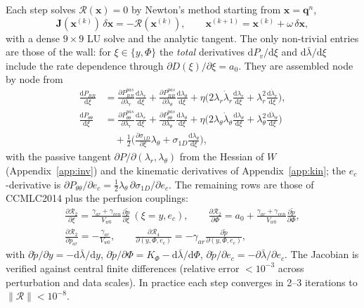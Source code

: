 \documentclass[11pt,a4paper]{article}
\newcommand{\dd}{\mathrm d}
\newcommand{\lt}{\lambda_\theta}
\newcommand{\lr}{\lambda_r}
\newcommand{\lb}{\bar\lambda}
\newcommand{\pf}{\tilde p}
\newcommand{\Vw}{V_{w0}}
\newcommand{\sig}{\sigma_{1D}}
\begin{document}
Each step solves $\mathcal R(\mathbf x)=0$ by Newton's method starting from $\mathbf x=\mathbf q^n$,
\[
\mathbf J(\mathbf x^{(k)})\,\delta\mathbf x=-\mathcal R(\mathbf x^{(k)}),\qquad \mathbf x^{(k+1)}=\mathbf x^{(k)}+\omega\,\delta\mathbf x,
\]
with a dense $9\times9$ LU solve and the analytic tangent. The only non-trivial entries are those of the wall: for $\xi\in\{y,\Phi\}$ the \emph{total} derivatives $\dd P_v/\dd\xi$ and $\dd\lb/\dd\xi$ include the rate dependence through $\partial D(\xi)/\partial\xi=a_0$. They are assembled node by node from
\begin{align*}
\frac{\dd P_{RR}}{\dd\xi}&=\frac{\partial P_{RR}^{pas}}{\partial\lr}\frac{\dd\lr}{\dd\xi}+\frac{\partial P_{RR}^{pas}}{\partial\lt}\frac{\dd\lt}{\dd\xi}+\eta\Big(2\lr\dot\lr\frac{\dd\lr}{\dd\xi}+\lr^2\frac{\dd\dot\lr}{\dd\xi}\Big),\\
\frac{\dd P_{\theta\theta}}{\dd\xi}&=\frac{\partial P_{\theta\theta}^{pas}}{\partial\lr}\frac{\dd\lr}{\dd\xi}+\frac{\partial P_{\theta\theta}^{pas}}{\partial\lt}\frac{\dd\lt}{\dd\xi}+\eta\Big(2\lt\dot\lt\frac{\dd\lt}{\dd\xi}+\lt^2\frac{\dd\dot\lt}{\dd\xi}\Big)\\
&\quad+\tfrac12\Big(\frac{\partial\sig}{\partial\xi}\lt+\sig\frac{\dd\lt}{\dd\xi}\Big),
\end{align*}
with the passive tangent $\partial P/\partial(\lr,\lt)$ from the Hessian of $W$ (Appendix~\ref{app:inv}) and the kinematic derivatives of Appendix~\ref{app:kin}; the $e_c$-derivative is $\partial P_{\theta\theta}/\partial e_c=\tfrac12\lt\,\partial\sig/\partial e_c$. The remaining rows are those of CCMLC2014 plus the perfusion couplings:
\begin{gather*}
\frac{\partial\mathcal R_2}{\partial\xi}=\frac{\gamma_{ar}+\gamma_{ven}}{\Vw}\frac{\partial\pf}{\partial\xi}\ (\xi=y,e_c),\qquad
\frac{\partial\mathcal R_2}{\partial\Phi}=a_0+\frac{\gamma_{ar}+\gamma_{ven}}{\Vw}\frac{\partial\pf}{\partial\Phi},\\
\frac{\partial\mathcal R_2}{\partial p_{ar}}=-\frac{\gamma_{ar}}{\Vw},\qquad
\frac{\partial\mathcal R_4}{\partial(y,\Phi,e_c)}=-\gamma_{ar}\frac{\partial\pf}{\partial(y,\Phi,e_c)},
\end{gather*}
with $\partial\pf/\partial y=-\dd\lb/\dd y$, $\partial\pf/\partial\Phi=K_\Phi-\dd\lb/\dd\Phi$, $\partial\pf/\partial e_c=-\partial\lb/\partial e_c$. The Jacobian is verified against central finite differences (relative error $<10^{-3}$ across perturbation and data scales). In practice each step converges in 2--3 iterations to $\|\mathcal R\|<10^{-8}$.
\end{document}
